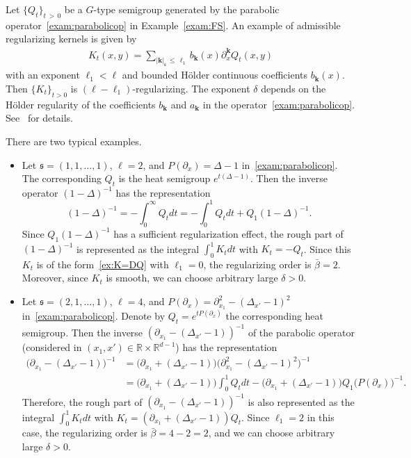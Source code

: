 \documentclass[AHL,Unicode,longabstracts,published]{cedram}
\newcommand{\bbR}{\mathbb{R}}
\newcommand{\mfs}{\mathfrak{s}}
\newcommand{\bfk}{\mathbf{k}}
\begin{document}
\begin{exam}
Let $\{Q_t\}_{t\,>\,0}$ be a $G$-type semigroup generated by the parabolic operator~\eqref{exam:parabolicop} in Example~\ref{exam:FS}. An example of admissible regularizing kernels is given by
\begin{align}\label{ex:K=DQ}
K_t(x,y)=\sum_{|{\bfk}|_\mfs\,\le\,\ell_1}b_{\bfk}(x)\partial_x^{\bfk}Q_t(x,y)
\end{align}
with an exponent $\ell_1<\ell$ and bounded H\"older continuous coefficients $b_{\bfk}(x)$. Then $\{K_t\}_{t>0}$ is $(\ell-\ell_1)$-regularizing. The exponent $\delta$ depends on the H\"older regularity of the coefficients $b_{\bfk}$ and $a_{\bfk}$ in the operator~\eqref{exam:parabolicop}. See~\cite[Appendix A]{BHK22} for details.


There are two typical examples.
\begin{itemize}
\item Let $\mfs=(1,1,\dots,1)$, $\ell=2$, and $P(\partial_x)=\Delta-1$ in~\eqref{exam:parabolicop}. The corresponding $Q_t$ is the heat semigroup $e^{t(\Delta-1)}$. Then the inverse operator $(1-\Delta)^{-1}$ has the representation
\[
(1-\Delta)^{-1}=-\int_0^\infty Q_tdt=-\int_0^1Q_tdt+Q_1(1-\Delta)^{-1}.
\]
Since $Q_1(1-\Delta)^{-1}$ has a sufficient regularization effect, the rough part of $(1-\Delta)^{-1}$ is represented as the integral $\int_0^1K_tdt$ with $K_t=-Q_t$. Since this $K_t$ is of the form~\eqref{ex:K=DQ} with $\ell_1=0$, the regularizing order is $\bar\beta=2$. Moreover, since $K_t$ is smooth, we can choose arbitrary large $\delta>0$.
\item Let $\mfs=(2,1,\dots,1)$, $\ell=4$, and $P(\partial_x)=\partial_{x_1}^2-(\Delta_{x'}-1)^2$ in~\eqref{exam:parabolicop}. Denote by $Q_t=e^{tP(\partial_x)}$ the corresponding heat semigroup. Then the inverse $(\partial_{x_1}-(\Delta_{x'}-1))^{-1}$ of the parabolic operator (considered in $(x_1,x')\in\bbR\times\bbR^{d-1}$) has the representation
\begin{align*}
\big(\partial_{x_1}-(\Delta_{x'}-1)\big)^{-1}&=\big(\partial_{x_1}+(\Delta_{x'}-1)\big)\big(\partial_{x_1}^2-(\Delta_{x'}-1)^2\big)^{-1}\\
&=\big(\partial_{x_1}+(\Delta_{x'}-1)\big)\int_0^1Q_tdt-\big(\partial_{x_1}+(\Delta_{x'}-1)\big)Q_1\big(P(\partial_x)\big)^{-1}.
\end{align*}
Therefore, the rough part of $(\partial_{x_1}-(\Delta_{x'}-1))^{-1}$ is also represented as the integral $\int_0^1K_tdt$ with $K_t=(\partial_{x_1}+(\Delta_{x'}-1))Q_t$. Since $\ell_1=2$ in this case, the regularizing order is $\bar\beta=4-2=2$, and we can choose arbitrary large $\delta>0$.
\end{itemize}
\end{exam}
\end{document}
